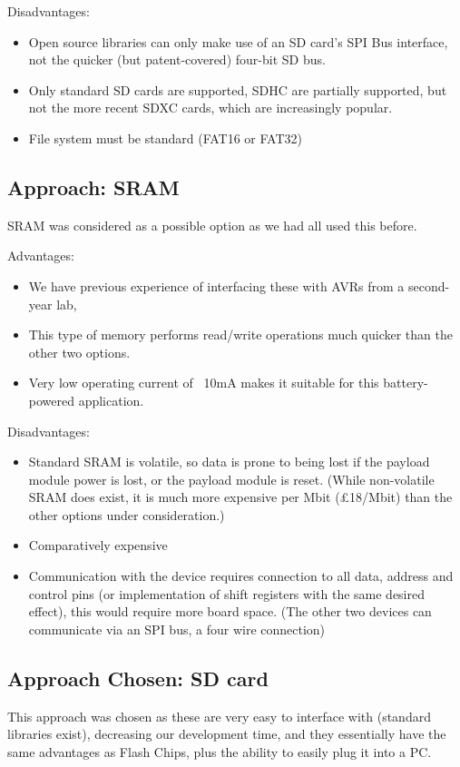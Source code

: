 Disadvantages:
\begin{itemize}
\item Open source libraries can only make use of an SD card's SPI Bus \cite{arduino_sd_library}
interface, not the quicker (but patent-covered) four-bit SD bus.
\item Only standard SD cards are supported, SDHC are partially supported, but not the more recent SDXC cards, which are increasingly popular.
\item File system must be standard (FAT16 or FAT32)
\end{itemize}

\subsection{Approach: SRAM}

SRAM was considered as a possible option as we had all used this before.

Advantages:
\begin{itemize}
\item We have previous experience of interfacing these with AVRs from a 
second-year lab, 
\item This type of memory performs read/write operations much quicker than 
the other two options.
\item Very low operating current of ~10mA makes it suitable for this battery-powered application.
\end{itemize}

Disadvantages:
\begin{itemize}
\item Standard SRAM is volatile, so data is prone to being lost if the payload 
module power is lost, or the payload module is reset. (While non-volatile SRAM 
does exist, it is much more expensive per Mbit (\pounds18/Mbit) than the other 
options under consideration.)
\item Comparatively expensive
\item Communication with the device requires connection to all data, address 
and control pins (or implementation of shift registers with the same desired 
effect), this would require more board space. (The other two devices can 
communicate via an SPI bus, a four wire connection)
\end{itemize}

\subsection{Approach Chosen: SD card}

This approach was chosen as these are very easy to interface with (standard libraries exist), decreasing our development time, 
and they essentially have the same advantages as Flash Chips, plus the ability to easily plug it into a PC.
